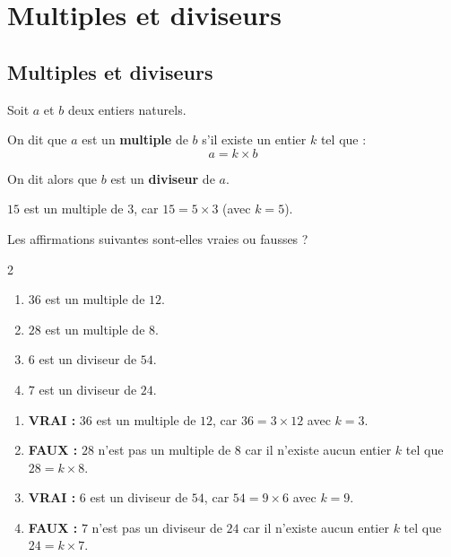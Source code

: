 \chapter{Multiples et diviseurs}

\section{Multiples et diviseurs}

\begin{definition}
	Soit $a$ et $b$ deux entiers naturels.

	On dit que $a$ est un \textbf{multiple} de $b$ s'il existe un entier $k$ tel que :
	\[
		a = k \times b
	\]

	On dit alors que $b$ est un \textbf{diviseur} de $a$.
\end{definition}

\begin{exemple}
	$15$ est un multiple de $3$, car $15 = 5 \times 3$ (avec $k = 5$).
\end{exemple}

\begin{methode}
	Les affirmations suivantes sont-elles vraies ou fausses ?
	\begin{multicols}{2}
		\begin{enumerate}[label=\alph*)]
			\item $36$ est un multiple de $12$.
			\item $28$ est un multiple de $8$.
			\item $6$ est un diviseur de $54$.
			\item $7$ est un diviseur de $24$.
		\end{enumerate}
	\end{multicols}

	\begin{correction}
		\nline
		\begin{enumerate}[label=\alph*)]
			\item \textbf{VRAI :} $36$ est un multiple de $12$, car $36 = 3 \times 12$ avec $k = 3$.
			\item \textbf{FAUX :} $28$ n'est pas un multiple de $8$ car il n'existe aucun entier $k$ tel que $28 = k \times 8$.
			\item \textbf{VRAI :} $6$ est un diviseur de $54$, car $54 = 9 \times 6$ avec $k = 9$.
			\item \textbf{FAUX :} $7$ n'est pas un diviseur de $24$ car il n'existe aucun entier $k$ tel que $24 = k \times 7$.
		\end{enumerate}
	\end{correction}
\end{methode}

